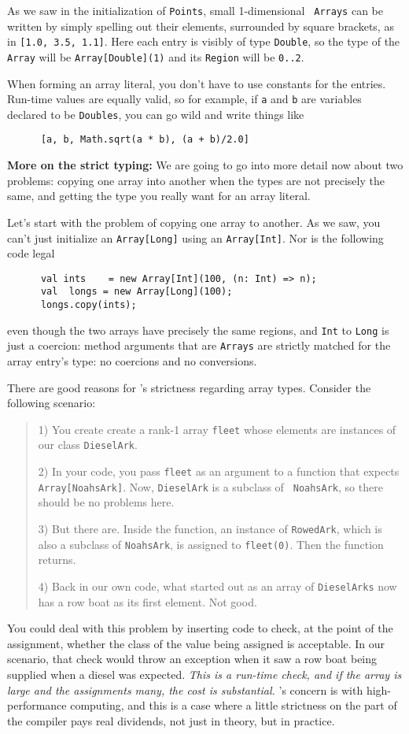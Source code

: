 As we saw in the initialization of {\tt Points}, small 1-dimensional {\tt
Arrays} can be written by simply spelling out their elements, surrounded by
square brackets, as in {\tt [1.0, 3.5, 1.1]}.  Here each entry is visibly of
type {\tt Double}, so the type of the {\tt Array} will be {\tt Array[Double](1)}
and its {\tt Region} will be {\tt 0..2}.  

When forming an array literal, you don't have to use
constants for the entries.  Run-time values are equally valid, so for example,
if {\tt a} and {\tt b} are variables declared to be {\tt Doubles}, you can go
wild and write things like
\begin{verbatim}
      [a, b, Math.sqrt(a * b), (a + b)/2.0]
\end{verbatim}
{\bf More on the strict typing:}  
We are going to go into more detail now about two problems: copying
one array into
another when the types are not precisely the same, and getting the type you
really want for an array literal.

Let's start with the problem of copying one array to another.  As we saw,
you can't just initialize an {\tt Array[Long]} using an {\tt Array[Int]}.  Nor is
the following code legal
\begin{verbatim}
      val ints    = new Array[Int](100, (n: Int) => n);
      val  longs = new Array[Long](100);
      longs.copy(ints);
\end{verbatim}
even though the two arrays have precisely the same regions, and {\tt Int}
to {\tt Long} is just a coercion: method arguments that are {\tt Arrays} are strictly
matched for the array entry's type: no coercions and no conversions.  

There are good reasons for \Xten's strictness regarding array types. 
Consider the following scenario:
\begin{quote}
1) You create create a rank-1 array {\tt fleet} whose elements are instances of
our class {\tt DieselArk}.

2) In your code, you pass {\tt fleet} as an argument to a function that expects
{\tt Array[NoahsArk]}.  Now, {\tt DieselArk} is a subclass of {\tt
NoahsArk}, so there should be no problems here.

3) But there are.  Inside the function, an instance of {\tt RowedArk}, which
is also a subclass of {\tt NoahsArk}, is assigned to {\tt fleet(0)}.  Then the
function returns.

4) Back in our own code, what started out as an array of {\tt DieselArks} now
has a row boat as its first element.  Not good.
\end{quote}
You could deal with this problem by inserting code to check, at the
point of the assignment, whether the class of the value being assigned is
acceptable.  In our scenario, that check would throw an exception when it saw a
row boat being supplied when a diesel was expected.  {\em This is a run-time check,
and if the array is large and the assignments many, the cost is substantial.} 
\Xten's concern is with high-performance computing, and this is a case where a
little strictness on the part of the \Xten{} compiler pays real dividends, not just
in theory, but in practice.

